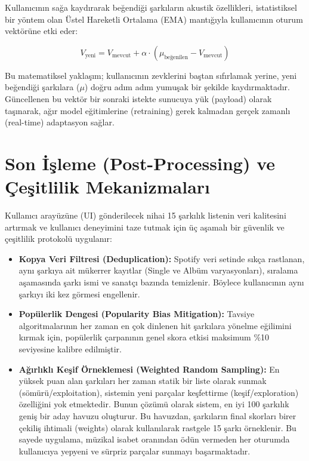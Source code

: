 \documentclass[12pt, a4paper]{report}
\begin{document}
Kullanıcının sağa kaydırarak beğendiği şarkıların akustik özellikleri, istatistiksel bir yöntem olan Üstel Hareketli Ortalama (EMA) mantığıyla kullanıcının oturum vektörüne etki eder:

$$V_{\text{yeni}} = V_{\text{mevcut}} + \alpha \cdot (\mu_{\text{beğenilen}} - V_{\text{mevcut}})$$

Bu matematiksel yaklaşım; kullanıcının zevklerini baştan sıfırlamak yerine, yeni beğendiği şarkılara ($\mu$) doğru adım adım yumuşak bir şekilde kaydırmaktadır. Güncellenen bu vektör bir sonraki istekte sunucuya yük (payload) olarak taşınarak, ağır model eğitimlerine (retraining) gerek kalmadan gerçek zamanlı (real-time) adaptasyon sağlar.

\section{Son İşleme (Post-Processing) ve Çeşitlilik Mekanizmaları}

Kullanıcı arayüzüne (UI) gönderilecek nihai 15 şarkılık listenin veri kalitesini artırmak ve kullanıcı deneyimini taze tutmak için üç aşamalı bir güvenlik ve çeşitlilik protokolü uygulanır:

\begin{itemize}
    \item \textbf{Kopya Veri Filtresi (Deduplication):} Spotify veri setinde sıkça rastlanan, aynı şarkıya ait mükerrer kayıtlar (Single ve Albüm varyasyonları), sıralama aşamasında şarkı ismi ve sanatçı bazında temizlenir. Böylece kullanıcının aynı şarkıyı iki kez görmesi engellenir.
    \item \textbf{Popülerlik Dengesi (Popularity Bias Mitigation):} Tavsiye algoritmalarının her zaman en çok dinlenen hit şarkılara yönelme eğilimini kırmak için, popülerlik çarpanının genel skora etkisi maksimum \%10 seviyesine kalibre edilmiştir.
    \item \textbf{Ağırlıklı Keşif Örneklemesi (Weighted Random Sampling):} En yüksek puan alan şarkıları her zaman statik bir liste olarak sunmak (sömürü/exploitation), sistemin yeni parçalar keşfettirme (keşif/exploration) özelliğini yok etmektedir. Bunun çözümü olarak sistem, en iyi 100 şarkılık geniş bir aday havuzu oluşturur. Bu havuzdan, şarkıların final skorları birer çekiliş ihtimali (weights) olarak kullanılarak rastgele 15 şarkı örneklenir. Bu sayede uygulama, müzikal isabet oranından ödün vermeden her oturumda kullanıcıya yepyeni ve sürpriz parçalar sunmayı başarmaktadır.
\end{itemize}
\end{document}
